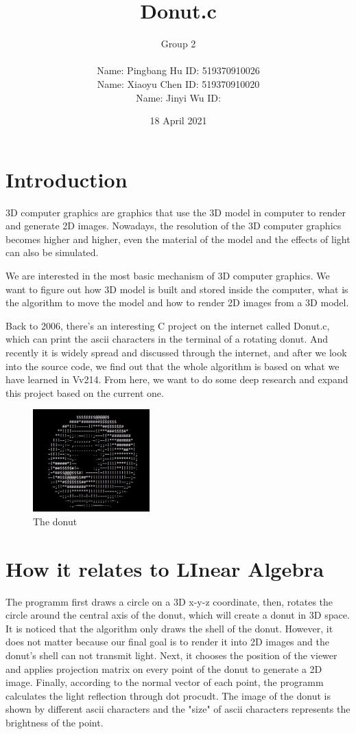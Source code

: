 \documentclass{article}
\title{Donut.c}
\author{Group 2 \\ \\
Name: Pingbang Hu ID: 519370910026 \\
Name: Xiaoyu Chen ID: 519370910020 \\
Name: Jinyi Wu ID: }
\date{18 April 2021}
\begin{document}
\maketitle

\section{Introduction}
3D computer graphics are graphics that use the 3D model in computer to render and generate 2D images. 
Nowadays, the resolution of the 3D computer graphics becomes higher and higher, even the material of the model and the effects of light can also be simulated.
\par We are interested in the most basic mechanism of 3D computer graphics. 
We want to figure out how 3D model is built and stored inside the computer, what is the algorithm to move the model and how to render 2D images from a 3D model.
\par Back to 2006, there's an interesting C project on the internet called Donut.c, which can print the ascii characters in the terminal of a rotating donut. 
And recently it is widely spread and discussed through the internet, and after we look into the source code, we find out that the whole algorithm is based on what we have learned in Vv214. 
From here, we want to do some deep research and expand this project based on the current one.
\begin{figure}[H]
  \centering
  \includegraphics[width=0.4\textwidth]{Figures/donut.jpg}
  \caption{The donut}
\end{figure}

\section{How it relates to LInear Algebra}
The programm first draws a circle on a 3D x-y-z coordinate, then, rotates the circle around the central axis of the donut, which will create a donut in 3D space.
It is noticed that the algorithm only draws the shell of the donut. 
However, it does not matter because our final goal is to render it into 2D images and the donut's shell can not transmit light. 
Next, it chooses the position of the viewer and applies projection matrix on every point of the donut to generate a 2D image.
Finally, according to the normal vector of each point, the programm calculates the light reflection through dot procudt. 
The image of the donut is shown by different ascii characters and the "size" of ascii characters represents the brightness of the point.\newline 
\end{document}
